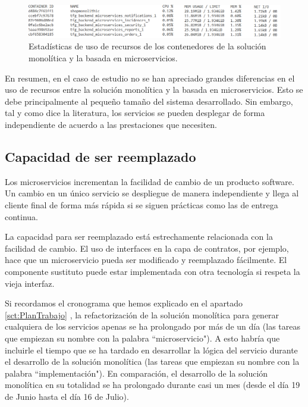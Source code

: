 \documentclass[11pt,spanish,listoffigures]{tfgetsinf}
\begin{document}
\begin{figure}[h]
\centering
\includegraphics[scale=0.65]{useMemory}
\caption{Estadísticas de uso de recursos de los contenedores de la solución monolítica y la basada en microservicios.}
\label{fig:UsoRecursos}
\end{figure}

En resumen, en el caso de estudio no se han apreciado grandes diferencias en el uso de recursos entre la solución monolítica y la basada en microservicios. Esto se debe principalmente al pequeño tamaño del sistema desarrollado. Sin embargo, tal y como dice la literatura, los servicios se pueden desplegar de forma independiente de acuerdo a las prestaciones que necesiten.

\subsection{Capacidad de ser reemplazado}

Los microservicios incrementan la facilidad de cambio de un producto software. Un cambio en un único servicio se despliegue de manera independiente y llega al cliente final de forma más rápida si se siguen prácticas como las de entrega continua.

La capacidad para ser reemplazado está estrechamente relacionada con la facilidad de cambio. El uso de interfaces en la capa de contratos, por ejemplo, hace que un microservicio pueda ser modificado y reemplazado fácilmente. El componente sustituto puede estar implementada con otra tecnología si respeta la vieja interfaz. 

Si recordamos el cronograma que hemos explicado en el apartado \ref{sct:PlanTrabajo} , la refactorización de la solución monolítica para generar cualquiera de los servicios apenas se ha prolongado por más de un día (las tareas que empiezan su nombre con la palabra ``microservicio"). A esto habría que incluirle el tiempo que se ha tardado en desarrollar la lógica del servicio durante el desarrollo de la solución monolítica (las tareas que empiezan su nombre con la palabra ``implementación"). En comparación, el desarrollo de la solución monolítica en su totalidad se ha prolongado durante casi un mes (desde el día 19 de Junio hasta el día 16 de Julio).
\end{document}
